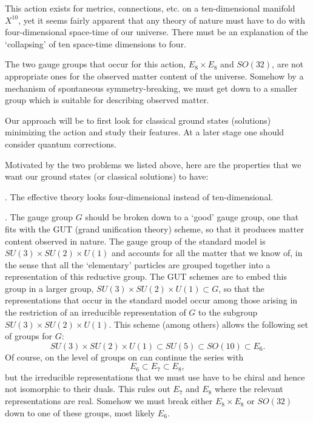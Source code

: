 \smallskip
{} This action  exists for metrics,
connections, etc. on a ten-dimensional manifold $X^{10}$, yet 
it seems fairly apparent that any theory of nature must have  to do
with four-dimensional space-time of our universe.  There must be an
explanation of the `collapsing' of ten space-time dimensions to four. 

\smallskip
{} The two gauge groups that occur for this
action, $E_8\times E_8$ and $SO(32)$, are not
appropriate ones for the 
observed matter content of the universe. Somehow  by a
mechanism of spontaneous symmetry-breaking, we must get down to a
smaller group which is suitable for describing observed matter. 


Our approach will be to first look for classical ground states
(solutions) minimizing the action and
study their features. 
At a later stage one should consider quantum corrections.

Motivated by the two problems we listed above, here are the properties
that we want our ground states (or classical solutions) to have:

\smallskip
{}.  The effective theory looks four-dimensional instead of
ten-dimensional. 

\smallskip
{}. The gauge group $G$ should be broken down to a `good' gauge group,
one that fits with the GUT (grand unification theory) scheme, so that
it produces matter content observed in nature.  The gauge group of the
standard model is $SU(3)\times SU(2)\times U(1)$ and accounts for all
the matter that we know of, in the sense that all the `elementary'
particles are grouped together into a representation of this reductive
group. 
The GUT schemes are to
embed this group in a larger  group, $SU(3)\times SU(2)\times
U(1)\subset G$, so that the  
representations that occur in the standard model occur among
those arising in the restriction of an irreducible representation of
$G$ to the subgroup $SU(3)\times SU(2)\times U(1)$. This scheme
(among others) 
allows the following set of groups for $G$:
$$SU(3)\times SU(2)\times U(1)\subset SU(5)\subset SO(10)\subset
E_6.$$
Of course, on the level of groups on can continue the series with
$$E_6\subset E_7\subset E_8,$$
but the irreducible representations that we must use have to be chiral
and hence 
not isomorphic to their duals.  This rules out $E_7$ and $E_8$ where
the relevant representations are real.
Somehow we must break either $E_8\times E_8$ or $SO(32)$ down to one
of these groups, most likely $E_6$. 


